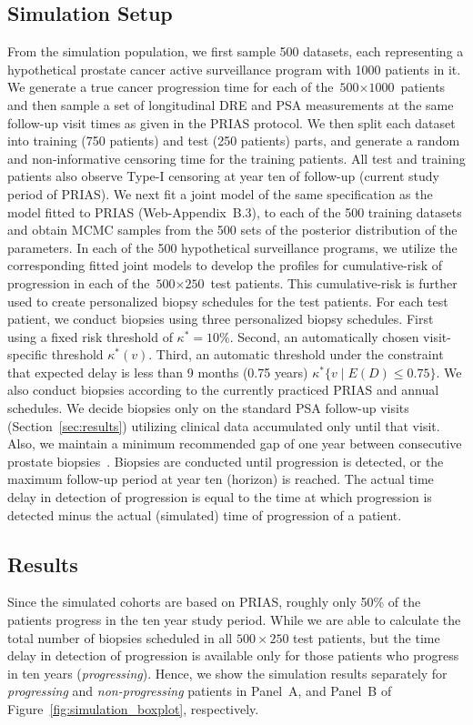 \subsection{Simulation Setup}
From the simulation population, we first sample 500 datasets, each representing a hypothetical prostate cancer active surveillance program with 1000 patients in it. We generate a true cancer progression time for each of the ${\mbox{500} \times \mbox{1000}}$ patients and then sample a set of longitudinal DRE and PSA measurements at the same follow-up visit times as given in the PRIAS protocol. We then split each dataset into training (750 patients) and test (250 patients) parts, and generate a random and non‐informative censoring time for the training patients. All test and training patients also observe Type-I censoring at year ten of follow-up (current study period of PRIAS). We next fit a joint model of the same specification as the model fitted to PRIAS (Web-Appendix~B.3), to each of the 500 training datasets and obtain MCMC samples from the 500 sets of the posterior distribution of the parameters. In each of the 500 hypothetical surveillance programs, we utilize the corresponding fitted joint models to develop the profiles for cumulative-risk of progression in each of the ${\mbox{500} \times \mbox{250}}$ test patients. This cumulative-risk is further used to create personalized biopsy schedules for the test patients. For each test patient, we conduct biopsies using three personalized biopsy schedules. First using a fixed risk threshold of $\kappa^*=10\%$. Second, an automatically chosen visit-specific threshold $\kappa^*(v)$. Third, an automatic threshold under the constraint that expected delay is less than 9 months (0.75 years) $\kappa^*\{v \mid E(D)\leq 0.75\}$. We also conduct biopsies according to the currently practiced PRIAS and annual schedules. We decide biopsies only on the standard PSA follow-up visits (Section~\ref{sec:results}) utilizing clinical data accumulated only until that visit. Also, we maintain a minimum recommended gap of one year between consecutive prostate biopsies~\citep{bokhorst2015compliance}. Biopsies are conducted until progression is detected, or the maximum follow-up period at year ten (horizon) is reached. The actual time delay in detection of progression is equal to the time at which progression is detected minus the actual (simulated) time of progression of a patient.

\subsection{Results}
Since the simulated cohorts are based on PRIAS, roughly only 50\% of the patients progress in the ten year study period. While we are able to calculate the total number of biopsies scheduled in all $500 \times 250$ test patients, but the time delay in detection of progression is available only for those patients who progress in ten years (\textit{progressing}). Hence, we show the simulation results separately for \textit{progressing} and \textit{non-progressing} patients in Panel~A, and Panel~B of Figure~\ref{fig:simulation_boxplot}, respectively.

